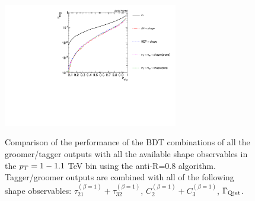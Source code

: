 \begin{figure}
\begin{center}
{\includegraphics[width=0.68\textwidth]{./Figures/TTagging/multi_variable/pT.1TeV.R.0.8/Rocs_optimum.pdf}}
\caption{Comparison of the performance of the BDT combinations of all the groomer/tagger outputs with all the available shape observables in the $p_T = 1-1.1$ TeV bin using the anti-\kT R=0.8 algorithm. Tagger/groomer outputs are combined with all of the following shape observables: $\tau_{21}^{(\beta=1)}+\tau_{32}^{(\beta=1)}$, $C_{2}^{(\beta=1)}+C_{3}^{(\beta=1)}$, $\Gamma_{\rm Qjet}$.}
\label{fig:pt1000_allcompare_AKt_R08_Final}
\end{center}
\end{figure}


